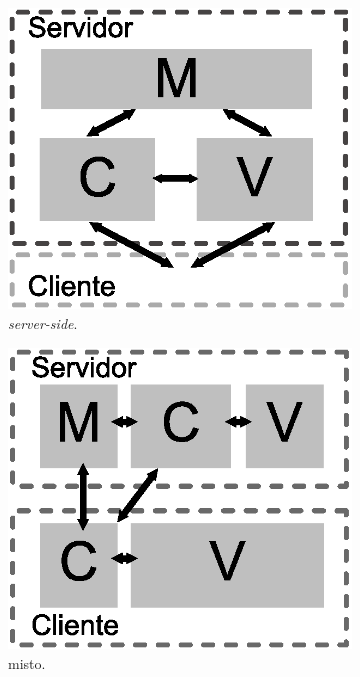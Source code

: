 \begin{figure}[h!]
	\centering
	\begin{subfigure}{.31\textwidth}
  		\centering
  		\includegraphics[width=.9\linewidth]{figuras/servidor.eps}
  		\caption{\textit{server-side}.}
  		\label{fig:submvc1}
	\end{subfigure}
	\begin{subfigure}{.31\textwidth}
  		\centering
  		\includegraphics[width=.9\linewidth]{figuras/misto.eps}
  		\caption{misto.}
  		\label{fig:submvc2}
	\end{subfigure}
	\begin{subfigure}{.31\textwidth}

\end{subfigure}
\end{figure}

